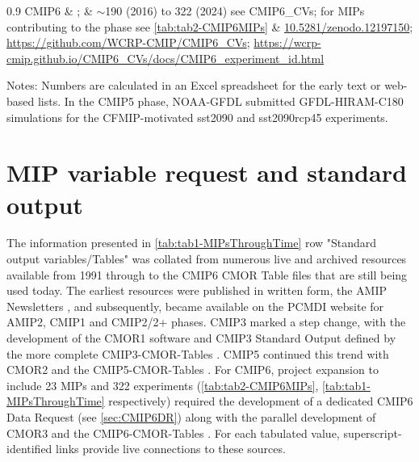 \documentclass[gmd, preprint]{copernicus}
\def\cred#1{{\color{red}#1}}
\begin{document}
\begin{table}[htp]
{\begin{tabularx}{0.9\textwidth}
			CMIP6 & \citet{eyring_overview_2016}; \citet{durack_cmip6_2024} & $\sim$190 (2016) to 322 (2024) see CMIP6\_CVs; for MIPs contributing to the phase see \autoref{tab:tab2-CMIP6MIPs} & \href{http://doi.org/10.5281/zenodo.12197150}{10.5281/zenodo.12197150}; \url{https://github.com/WCRP-CMIP/CMIP6\_CVs}; \url{https://wcrp-cmip.github.io/CMIP6\_CVs/docs/CMIP6\_experiment\_id.html}\\
			\hline		
		\end{tabularx}
	} %
	\label{tab:tabAppA1-MIPExperiments}
	\footnotesize{Notes: \cred{Numbers are calculated in an Excel spreadsheet for the early text or web-based lists.} In the CMIP5 phase, NOAA-GFDL submitted GFDL-HIRAM-C180 simulations for the CFMIP-motivated sst2090 and sst2090rcp45 experiments.}
\end{table}


\section{MIP variable request and standard output}  %
\label{sec:secAppB1-MIPStandardOutput}
The information presented in \autoref{tab:tab1-MIPsThroughTime} row "Standard output variables/Tables" was collated from numerous live and archived resources available from 1991 through to the CMIP6 CMOR Table files that are still being used today. The earliest resources were published in written form, the AMIP Newsletters \citep[e.g.,][]{gates_amip_1991}, and subsequently, became available on the PCMDI website for AMIP2, CMIP1 and CMIP2/2+ phases. CMIP3 marked a step change, with the development of the CMOR1 software \citep{taylor_cmor_2006} and CMIP3 Standard Output defined by the more complete CMIP3-CMOR-Tables \citep{doutriaux_cmip3_2005}. CMIP5 continued this trend with CMOR2 \citep{doutriaux_cmor_2011} and the CMIP5-CMOR-Tables \citep{doutriaux_cmip5_2013}. For CMIP6, project expansion to include 23 MIPs and 322 experiments (\autoref{tab:tab2-CMIP6MIPs}, \autoref{tab:tab1-MIPsThroughTime} respectively) required the development of a dedicated CMIP6 Data Request (see \autoref{sec:CMIP6DR}) along with the parallel development of CMOR3 \citep{mauzey_cmor_2024} and the CMIP6-CMOR-Tables \citep{nadeau_cmip6_2017}. For each tabulated value, superscript-identified links provide live connections to these sources.
\end{document}

